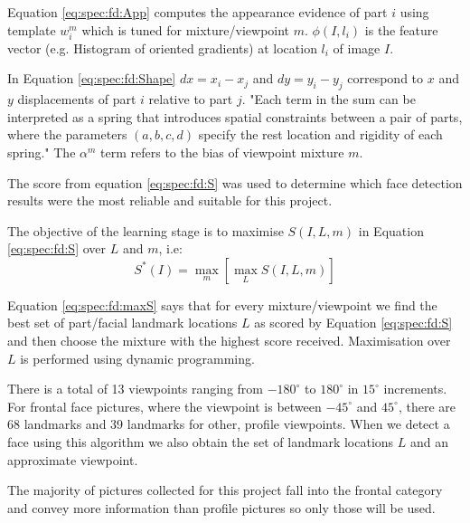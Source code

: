 Equation \ref{eq:spec:fd:App} computes the appearance evidence of part $i$
using template $w_i^m$ which is tuned for mixture/viewpoint $m$. $\phi(I,l_i)$
is the feature vector (e.g. Histogram of oriented gradients) at location $l_i$
of image $I$.

In Equation \ref{eq:spec:fd:Shape} $dx = x_i  - x_j$ and $dy = y_i - y_j$
correspond to $x$ and $y$ displacements of part $i$ relative to part $j$. "Each
term in the sum can be interpreted as a spring that introduces spatial
constraints between a pair of parts, where the parameters $(a,b,c,d)$ specify
the rest location and rigidity of each spring." \citep{zhu2012face}
The $\alpha^m$ term refers to the bias of viewpoint mixture $m$. 

The score from equation \ref{eq:spec:fd:S} was used to determine which face 
detection results were the most reliable and suitable for this project.

The objective of the learning stage is to maximise $S(I,L,m)$ in Equation
\ref{eq:spec:fd:S} over $L$ and $m$, i.e:
\begin{equation}
\label{eq:spec:fd:maxS}
S^*(I) = \max_m[\max_L S(I,L,m)]
\end{equation}

Equation \ref{eq:spec:fd:maxS} says that for every mixture/viewpoint we find
the best set of part/facial landmark locations $L$ as scored by Equation
\ref{eq:spec:fd:S} and then choose the mixture with the highest score received.
Maximisation over $L$ is performed using dynamic programming.


There is a total of 13 viewpoints ranging from $-180^\circ$ to $180^\circ$ in
$15^\circ$ increments. For frontal face pictures, where the viewpoint is
between $-45^\circ$ and $45^\circ$, there are 68 landmarks and 39 landmarks for
other, profile viewpoints. When we detect a face using this algorithm we also
obtain the set of landmark locations $L$ and an approximate viewpoint.

The majority of pictures collected for this project fall into the frontal
category and convey more information than profile pictures so only those will
be used.

